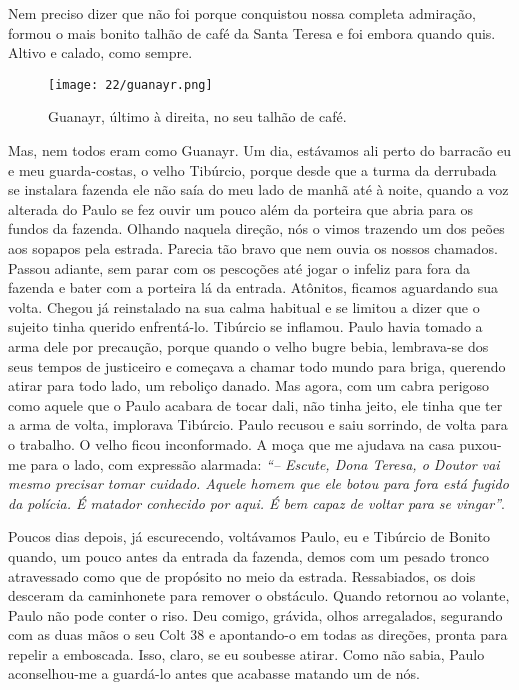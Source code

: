 Nem preciso dizer que não foi porque conquistou nossa completa admiração, formou o mais bonito talhão de café da Santa Teresa e foi embora quando quis.
Altivo e calado, como sempre.

\begin{figure}
\centering
\texttt{[image: 22/guanayr.png]}
\caption{Guanayr, último à direita, no seu talhão de café.}
\end{figure}

Mas, nem todos eram como Guanayr.
Um dia, estávamos ali perto do barracão eu e meu guarda-costas, o velho Tibúrcio, porque desde que a turma da derrubada se instalara fazenda ele não saía do meu lado de manhã até à noite, quando a voz alterada do Paulo se fez ouvir um pouco além da porteira que abria para os fundos da fazenda.
Olhando naquela direção, nós o vimos trazendo um dos peões aos sopapos pela estrada.
Parecia tão bravo que nem ouvia os nossos chamados.
Passou adiante, sem parar com os pescoções até jogar o infeliz para fora da fazenda e bater com a porteira lá da entrada.
Atônitos, ficamos aguardando sua volta.
Chegou já reinstalado na sua calma habitual e se limitou a dizer que o sujeito tinha querido enfrentá-lo.
Tibúrcio se inflamou.
Paulo havia tomado a arma dele por precaução, porque quando o velho bugre bebia, lembrava-se dos seus tempos de justiceiro e começava a chamar todo mundo para briga, querendo atirar para todo lado, um reboliço danado.
Mas agora, com um cabra perigoso como aquele que o Paulo acabara de tocar dali, não tinha jeito, ele tinha que ter a arma de volta, implorava Tibúrcio.
Paulo recusou e saiu sorrindo, de volta para o trabalho.
O velho ficou inconformado.
A moça que me ajudava na casa puxou-me para o lado, com expressão alarmada: 
\textit{``-- Escute, Dona Teresa, o Doutor vai mesmo precisar tomar cuidado.
Aquele homem que ele botou para fora está fugido da polícia.
É matador conhecido por aqui.
É bem capaz de voltar para se vingar''}.


Poucos dias depois, já escurecendo, voltávamos Paulo, eu e Tibúrcio de Bonito quando, um pouco antes da entrada da fazenda, demos com um pesado tronco atravessado como que de propósito no meio da estrada.
Ressabiados, os dois desceram da caminhonete para remover o obstáculo.
Quando retornou ao volante, Paulo não pode conter o riso.
Deu comigo, grávida, olhos arregalados, segurando com as duas mãos o seu Colt 38 e apontando-o em todas as direções, pronta para repelir a emboscada.
Isso, claro, se eu soubesse atirar.
Como não sabia, Paulo aconselhou-me a guardá-lo antes que acabasse matando um de nós.


